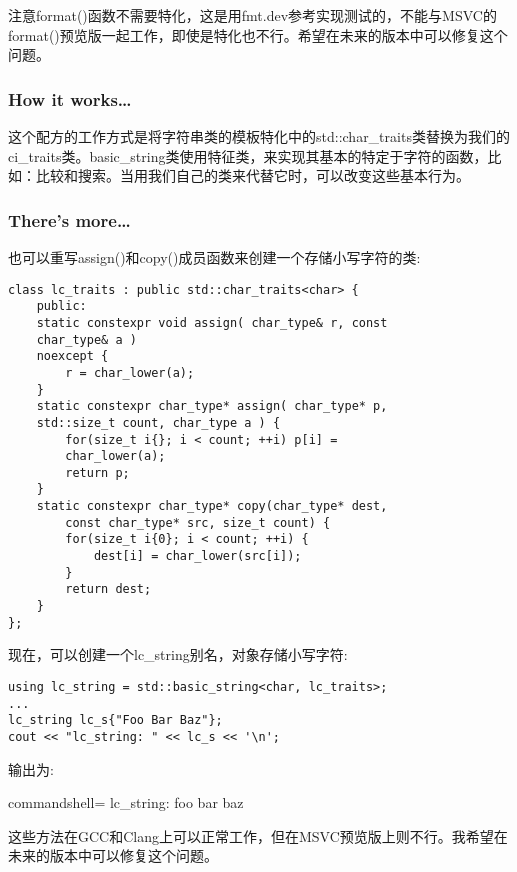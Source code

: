 \begin{tcolorbox}[colback=webgreen!5!white,colframe=webgreen!75!black,title=Note]
注意format()函数不需要特化，这是用fmt.dev参考实现测试的，不能与MSVC的format()预览版一起工作，即使是特化也不行。希望在未来的版本中可以修复这个问题。
\end{tcolorbox}

\subsubsection{How it works…}

这个配方的工作方式是将字符串类的模板特化中的std::char\_traits类替换为我们的ci\_traits类。basic\_string类使用特征类，来实现其基本的特定于字符的函数，比如：比较和搜索。当用我们自己的类来代替它时，可以改变这些基本行为。

\subsubsection{There's more…}

也可以重写assign()和copy()成员函数来创建一个存储小写字符的类:

\begin{lstlisting}[style=styleCXX]
class lc_traits : public std::char_traits<char> {
	public:
	static constexpr void assign( char_type& r, const
	char_type& a )
	noexcept {
		r = char_lower(a);
	}
	static constexpr char_type* assign( char_type* p,
	std::size_t count, char_type a ) {
		for(size_t i{}; i < count; ++i) p[i] =
		char_lower(a);
		return p;
	}
	static constexpr char_type* copy(char_type* dest,
		const char_type* src, size_t count) {
		for(size_t i{0}; i < count; ++i) {
			dest[i] = char_lower(src[i]);
		}
		return dest;
	}
};
\end{lstlisting}

现在，可以创建一个lc\_string别名，对象存储小写字符:

\begin{lstlisting}[style=styleCXX]
using lc_string = std::basic_string<char, lc_traits>;
...
lc_string lc_s{"Foo Bar Baz"};
cout << "lc_string: " << lc_s << '\n';
\end{lstlisting}

输出为:

\begin{tcblisting}{commandshell={}}
lc_string: foo bar baz
\end{tcblisting}

\begin{tcolorbox}[colback=webgreen!5!white,colframe=webgreen!75!black,title=Note]
这些方法在GCC和Clang上可以正常工作，但在MSVC预览版上则不行。我希望在未来的版本中可以修复这个问题。
\end{tcolorbox}



















